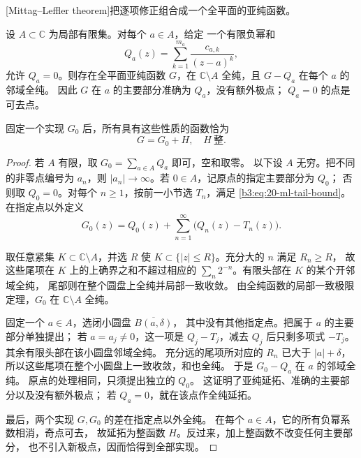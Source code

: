 [Mittag--Leffler theorem]把逐项修正组合成一个全平面的亚纯函数。

\begin{theorem}\label{b3:thm:20-mittag-leffler}
设 \(A\subset\mathbb C\) 为局部有限集。对每个 \(a\in A\)，给定
一个有限负幂和
\[
 Q_a(z)=\sum_{k=1}^{m_a}\frac{c_{a,k}}{(z-a)^k},
\]
允许 \(Q_a=0\)。则存在全平面亚纯函数 \(G\)，在
\(\mathbb C\setminus A\) 全纯，且 \(G-Q_a\) 在每个 \(a\) 的邻域全纯。
因此 \(G\) 在 \(a\) 的主要部分准确为 \(Q_a\)，没有额外极点；
\(Q_a=0\) 的点是可去点。

\ProseParagraphBreak
固定一个实现 \(G_0\) 后，所有具有这些性质的函数恰为
\[
 G=G_0+H,\quad H\ \text{整}.
\]
\end{theorem}
\begin{proof}
若 \(A\) 有限，取 \(G_0=\sum_{a\in A}Q_a\) 即可，空和取零。
以下设 \(A\) 无穷。把不同的非零点编号为 \(a_n\)，则
\(|a_n|\to\infty\)。若 \(0\in A\)，记原点的指定主要部分为 \(Q_0\)；
否则取 \(Q_0=0\)。对每个 \(n\ge1\)，按前一小节选 \(T_n\)，满足
\eqref{b3:eq:20-ml-tail-bound}。在指定点以外定义
\begin{equation}\label{b3:eq:20-ml-construction}
 G_0(z)=Q_0(z)+\sum_{n=1}^\infty\bigl(Q_n(z)-T_n(z)\bigr).
\end{equation}

取任意紧集 \(K\subset\mathbb C\setminus A\)，并选 \(R\) 使
\(K\subset\{|z|\le R\}\)。充分大的 \(n\) 满足 \(R_n\ge R\)，
故这些尾项在 \(K\) 上的上确界之和不超过相应的
\(\sum_n2^{-n}\)。有限头部在 \(K\) 的某个开邻域全纯，
尾部则在整个圆盘上全纯并局部一致收敛。
由全纯函数的局部一致极限定理，\(G_0\) 在
\(\mathbb C\setminus A\) 全纯。

固定一个 \(a\in A\)，选闭小圆盘 \(\overline{B(a,\delta)}\)，
其中没有其他指定点。把属于 \(a\) 的主要部分单独提出；
若 \(a=a_j\ne0\)，这一项是 \(Q_j-T_j\)，减去 \(Q_j\) 后只剩多项式
\(-T_j\)。其余有限头部在该小圆盘邻域全纯。
充分远的尾项所对应的 \(R_n\) 已大于 \(|a|+\delta\)，
所以这些尾项在整个小圆盘上一致收敛，和也全纯。
于是 \(G_0-Q_a\) 在 \(a\) 的邻域全纯。
原点的处理相同，只须提出独立的 \(Q_0\)。
这证明了亚纯延拓、准确的主要部分以及没有额外极点；
若 \(Q_a=0\)，就在该点作全纯延拓。

最后，两个实现 \(G,G_0\) 的差在指定点以外全纯。
在每个 \(a\in A\)，它的所有负幂系数相消，奇点可去，
故延拓为整函数 \(H\)。反过来，加上整函数不改变任何主要部分，
也不引入新极点，因而恰得到全部实现。
\end{proof}

